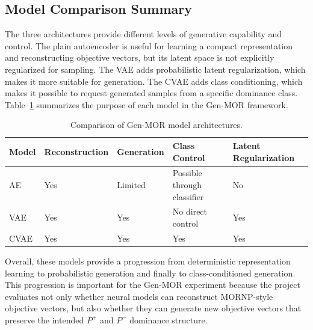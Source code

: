 \subsection{Model Comparison Summary}
\label{subsec:model_comparison_summary}

The three architectures provide different levels of generative capability and control. The plain autoencoder is useful for learning a compact representation and reconstructing objective vectors, but its latent space is not explicitly regularized for sampling. The VAE adds probabilistic latent regularization, which makes it more suitable for generation. The CVAE adds class conditioning, which makes it possible to request generated samples from a specific dominance class. Table~\ref{tab:model_comparison_summary} summarizes the purpose of each model in the Gen-MOR framework.

\begin{table}[H]
\centering
\caption{Comparison of Gen-MOR model architectures.}
\label{tab:model_comparison_summary}
\begin{tabularx}{\textwidth}{|l|X|X|X|X|}
\hline
\textbf{Model} & \textbf{Reconstruction} & \textbf{Generation} & \textbf{Class Control} & \textbf{Latent Regularization} \\
\hline
AE
&
Yes
&
Limited
&
Possible through classifier
&
No
\\
VAE
&
Yes
&
Yes
&
No direct control
&
Yes
\\
CVAE
&
Yes
&
Yes
&
Yes
&
Yes
\\
\hline
\end{tabularx}
\end{table}

Overall, these models provide a progression from deterministic representation learning to probabilistic generation and finally to class-conditioned generation. This progression is important for the Gen-MOR experiment because the project evaluates not only whether neural models can reconstruct MORNP-style objective vectors, but also whether they can generate new objective vectors that preserve the intended $P^{+}$ and $P^{-}$ dominance structure.